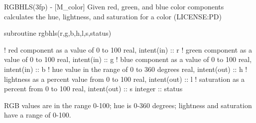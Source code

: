 \begin{DoxyDescription}
\item[\label{_RGBHLS}%
N\+A\+ME ]R\+G\+B\+H\+L\+S(3fp) -\/ \mbox{[}M\+\_\+color\mbox{]} Given red, green, and blue color components calculates the hue, lightness, and saturation for a color (L\+I\+C\+E\+N\+SE\+:PD) 


\item[S\+Y\+N\+O\+P\+S\+IS ]
\begin{DoxyPre}\end{DoxyPre}



\begin{DoxyPre}    subroutine rgbhls(r,g,b,h,l,s,status)\end{DoxyPre}



\begin{DoxyPre}     ! red component as a value of 0 to 100
     real, intent(in)  :: r
     ! green component as a value of 0 to 100
     real, intent(in)  :: g
     ! blue component as a value of 0 to 100
     real, intent(in)  :: b
     ! hue value in the range of 0 to 360 degrees
     real, intent(out) :: h
     ! lightness as a percent value from 0 to 100
     real, intent(out) :: l
     ! saturation as a percent from 0 to 100
     real, intent(out) :: s
     integer           :: status
    \end{DoxyPre}
 


\item[D\+E\+S\+C\+R\+I\+P\+T\+I\+ON ]

R\+GB values are in the range 0-\/100; hue is 0-\/360 degrees; lightness and saturation have a range of 0-\/100. ~\newline
~\newline



\end{DoxyDescription}
